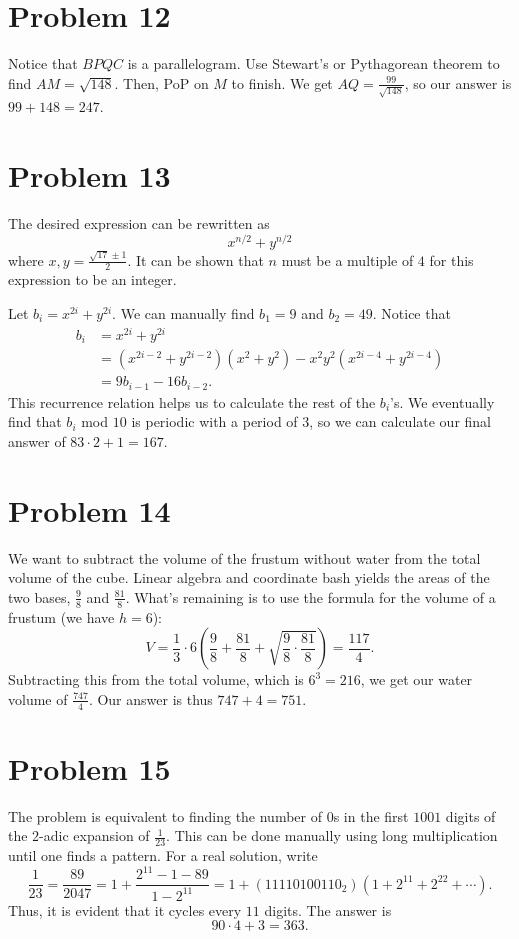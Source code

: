 \documentclass{scrartcl}
\begin{document}
\section*{Problem 12}
Notice that $BPQC$ is a parallelogram.
Use Stewart's or Pythagorean theorem to find $AM = \sqrt{148}$.
Then, PoP on $M$ to finish.
We get $AQ = \frac{99}{\sqrt{148}}$, so our answer is $99 + 148 = \boxed{247}$.

\section*{Problem 13}
The desired expression can be rewritten as
\[ x^{n/2} + y^{n/2} \]
where $x,y = \frac{\sqrt{17} \pm 1}{2}$.
It can be shown that $n$ must be a multiple of $4$ for this expression to be an integer.

Let $b_i = x^{2i} + y^{2i}$.
We can manually find $b_1 = 9$ and $b_2 = 49$.
Notice that
\begin{align*}
b_i &= x^{2i} + y^{2i} \\
&= (x^{2i-2} + y^{2i-2})(x^2 + y^2) - x^2y^2(x^{2i-4} + y^{2i-4}) \\
&= 9b_{i-1} - 16b_{i-2}.
\end{align*}
This recurrence relation helps us to calculate the rest of the $b_i$'s.
We eventually find that $b_i$ mod $10$ is periodic with a period of $3$,
so we can calculate our final answer of $83 \cdot 2 + 1 = \boxed{167}$.

\section*{Problem 14}
We want to subtract the volume of the frustum without water
from the total volume of the cube.
Linear algebra and coordinate bash yields the areas of the two bases,
$\frac98$ and $\frac{81}{8}$.
What's remaining is to use the formula for the volume of a frustum (we have $h=6$):
\[ V = \frac13 \cdot 6 \left(\frac98 + \frac{81}{8} + \sqrt{\frac98 \cdot \frac{81}{8}}\right) = \frac{117}{4}. \]
Subtracting this from the total volume, which is $6^3 = 216$,
we get our water volume of $\frac{747}{4}$.
Our answer is thus $747 + 4 = \boxed{751}$.

\section*{Problem 15}
The problem is equivalent to finding the number of $0$s in the first $1001$ digits
of the $2$-adic expansion of $\frac{1}{23}$.
This can be done manually using long multiplication until one finds a pattern.
For a real solution, write
\[ \frac{1}{23} = \frac{89}{2047} = 1 + \frac{2^{11} - 1 - 89}{1 - 2^{11}} = 1 + (11110100110_2)(1 + 2^{11} + 2^{22} + \cdots). \]
Thus, it is evident that it cycles every $11$ digits.
The answer is
\[ 90 \cdot 4 + 3 = \boxed{363}. \]
\end{document}
